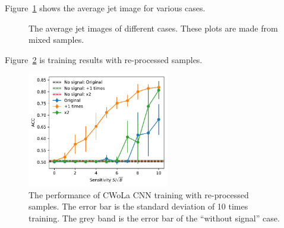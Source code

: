 \documentclass[12pt]{article}
\begin{document}
		Figure~\ref{fig:jet_constituent_average_jet_image_aug_1_x2} shows the average jet image for various cases.
		\begin{figure}[htpb]
			\centering
			\caption{The average jet images of different cases. These plots are made from mixed samples.}
			\label{fig:jet_constituent_average_jet_image_aug_1_x2}
		\end{figure}

		Figure~\ref{fig:cwola_hunting_cnn_acc_x2_luminosity_re-processed_sample} is training results with re-processed samples.
		\begin{figure}[htpb]
			\centering
			\includegraphics[width=0.55\textwidth]{HVmodel_CWoLa_CNN_aug_1_x2_re-process.pdf}
			\caption{The performance of CWoLa CNN training with re-processed samples. The error bar is the standard deviation of 10 times training. The grey band is the error bar of the ``without signal'' case.}
			\label{fig:cwola_hunting_cnn_acc_x2_luminosity_re-processed_sample}
		\end{figure}
\end{document}

